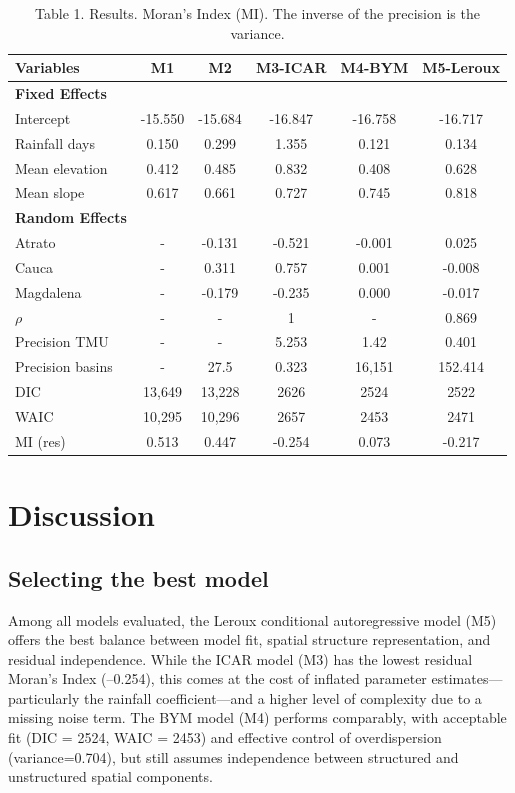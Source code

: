 \documentclass[journal abbreviation, manuscript]{copernicus}
\begin{document}
\begin{table}[h]
\caption{Table 1. Results. Moran’s Index (MI). The inverse of the precision is the variance.}\label{tab1}
\begin{tabular}{@{}lccccc@{}}
\toprule
Variables & M1 & M2 & M3-ICAR & M4-BYM & M5-Leroux \\
\midrule
\textbf{Fixed Effects} & & & & & \\
Intercept & -15.550 & -15.684 & -16.847 & -16.758 & -16.717 \\
Rainfall days & 0.150 & 0.299 & 1.355 & 0.121 & 0.134 \\
Mean elevation & 0.412 & 0.485 & 0.832 & 0.408 & 0.628 \\
Mean slope & 0.617 & 0.661 & 0.727 & 0.745 & 0.818 \\
\textbf{Random Effects} & & & & & \\
Atrato & - & -0.131 & -0.521 & -0.001 & 0.025 \\
Cauca & - & 0.311 & 0.757 & 0.001 & -0.008 \\
Magdalena & - & -0.179 & -0.235 & 0.000 & -0.017 \\
$\rho$ & - & - & 1 & - & 0.869 \\
Precision TMU & - & - & 5.253 & 1.42 & 0.401 \\
Precision basins & - & 27.5 & 0.323 & 16,151 & 152.414 \\
\midrule
DIC & 13,649 & 13,228 & 2626 & 2524 & 2522 \\
WAIC & 10,295 & 10,296 & 2657 & 2453 & 2471 \\
MI (res) & 0.513 & 0.447 & -0.254 & 0.073 & -0.217 \\
\bottomrule
\end{tabular}
\end{table}

\section{Discussion}\label{sec5}

\subsection{Selecting the best model}\label{subsec51}

Among all models evaluated, the Leroux conditional autoregressive model (M5) offers the best balance between model fit, spatial structure representation, and residual independence. While the ICAR model (M3) has the lowest residual Moran’s Index (–0.254), this comes at the cost of inflated parameter estimates—particularly the rainfall coefficient—and a higher level of complexity due to a missing noise term. The BYM model (M4) performs comparably, with acceptable fit (DIC = 2524, WAIC = 2453) and effective control of overdispersion (variance=0.704), but still assumes independence between structured and unstructured spatial components.
\end{document}
